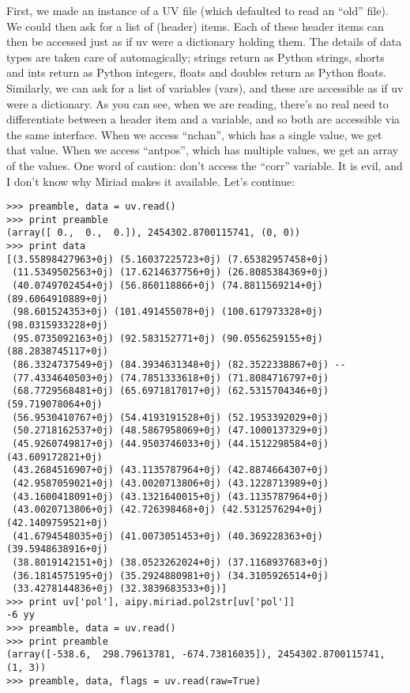 First, we made an instance of a UV file (which defaulted to read an ``old''
file).  We could then ask for a list of (header) items.  Each of these header
items can then be accessed just as if uv were a dictionary holding them.  The
details of data types are taken care of automagically; strings return as Python
strings, shorts and ints return as Python integers, floats and doubles return
as Python floats.  Similarly, we can ask for a list of variables (vars), and
these are accessible as if uv were a dictionary.  As you can see, when we are
reading, there's no real need to differentiate between a header item and a
variable, and so both are accessible via the same interface.  When we access
``nchan'', which has a single value, we get that value.  When we access
``antpos'', which has multiple values, we get an array of the values.
One word of caution: don't access the ``corr'' variable.  It is evil, and
I don't know why Miriad makes it available.  Let's continue:

\begin{verbatim}
>>> preamble, data = uv.read()
>>> print preamble
(array([ 0.,  0.,  0.]), 2454302.8700115741, (0, 0))
>>> print data
[(3.55898427963+0j) (5.16037225723+0j) (7.65382957458+0j)
 (11.5349502563+0j) (17.6214637756+0j) (26.8085384369+0j)
 (40.0749702454+0j) (56.860118866+0j) (74.8811569214+0j) (89.6064910889+0j)
 (98.601524353+0j) (101.491455078+0j) (100.617973328+0j) (98.0315933228+0j)
 (95.0735092163+0j) (92.583152771+0j) (90.0556259155+0j) (88.2838745117+0j)
 (86.3324737549+0j) (84.3934631348+0j) (82.3522338867+0j) --
 (77.4334640503+0j) (74.7851333618+0j) (71.8084716797+0j)
 (68.7729568481+0j) (65.6971817017+0j) (62.5315704346+0j) (59.719078064+0j)
 (56.9530410767+0j) (54.4193191528+0j) (52.1953392029+0j)
 (50.2718162537+0j) (48.5867958069+0j) (47.1000137329+0j)
 (45.9260749817+0j) (44.9503746033+0j) (44.1512298584+0j) (43.609172821+0j)
 (43.2684516907+0j) (43.1135787964+0j) (42.8874664307+0j)
 (42.9587059021+0j) (43.0020713806+0j) (43.1228713989+0j)
 (43.1600418091+0j) (43.1321640015+0j) (43.1135787964+0j)
 (43.0020713806+0j) (42.726398468+0j) (42.5312576294+0j) (42.1409759521+0j)
 (41.6794548035+0j) (41.0073051453+0j) (40.369228363+0j) (39.5948638916+0j)
 (38.8019142151+0j) (38.0523262024+0j) (37.1168937683+0j)
 (36.1814575195+0j) (35.2924880981+0j) (34.3105926514+0j)
 (33.4278144836+0j) (32.3839683533+0j)]
>>> print uv['pol'], aipy.miriad.pol2str[uv['pol']]
-6 yy
>>> preamble, data = uv.read()
>>> print preamble
(array([-538.6,  298.79613781, -674.73816035]), 2454302.8700115741, (1, 3))
>>> preamble, data, flags = uv.read(raw=True)
\end{verbatim}

